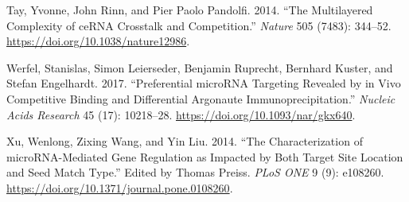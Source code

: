 \documentclass[]{article}
\begin{document}
\leavevmode\hypertarget{ref-tay_multilayered_2014}{}%
Tay, Yvonne, John Rinn, and Pier Paolo Pandolfi. 2014. ``The
Multilayered Complexity of ceRNA Crosstalk and Competition.''
\emph{Nature} 505 (7483): 344--52.
\url{https://doi.org/10.1038/nature12986}.

\leavevmode\hypertarget{ref-werfel_preferential_2017}{}%
Werfel, Stanislas, Simon Leierseder, Benjamin Ruprecht, Bernhard Kuster,
and Stefan Engelhardt. 2017. ``Preferential microRNA Targeting Revealed
by in Vivo Competitive Binding and Differential Argonaute
Immunoprecipitation.'' \emph{Nucleic Acids Research} 45 (17): 10218--28.
\url{https://doi.org/10.1093/nar/gkx640}.

\leavevmode\hypertarget{ref-xu_characterization_2014}{}%
Xu, Wenlong, Zixing Wang, and Yin Liu. 2014. ``The Characterization of
microRNA-Mediated Gene Regulation as Impacted by Both Target Site
Location and Seed Match Type.'' Edited by Thomas Preiss. \emph{PLoS ONE}
9 (9): e108260. \url{https://doi.org/10.1371/journal.pone.0108260}.
\end{document}
